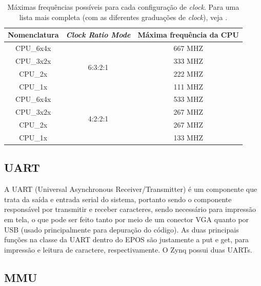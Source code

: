 \begin{table}[ht]
	\centering
	\begin{tabular}{ccc}
		\hline\hline
		Nomenclatura & \emph{Clock Ratio Mode} & Máxima frequência da CPU\\[0.5ex]
		\hline
		CPU\_6x4x & \multirow{4}{*}{6:3:2:1} & 667 MHZ\\
		CPU\_3x2x &                          & 333 MHZ\\
		CPU\_2x   &                          & 222 MHZ\\
		CPU\_1x   &                          & 111 MHZ\\
		\hline
		CPU\_6x4x & \multirow{4}{*}{4:2:2:1} & 533 MHZ\\
		CPU\_3x2x &                          & 267 MHZ\\
		CPU\_2x   &                          & 267 MHZ\\
		CPU\_1x   &                          & 133 MHZ\\[1ex]
		\hline
	\end{tabular}
	\caption{Máximas frequências possíveis para cada configuração de \emph{clock}. Para uma lista mais completa (com as diferentes graduações de \emph{clock}), veja \cite[p.~13]{data_sheet}.}
	\label{tab:clocks}
\end{table}


\subsection{UART}
A UART (Universal Asynchronous Receiver/Transmitter) é um componente que trata da saída e entrada serial do sistema, portanto sendo o componente responsável por transmitir e receber caracteres, sendo necessário para impressão em tela, o que pode ser feito tanto por meio de um conector VGA quanto por USB (usado principalmente para depuração do código). As duas principais funções na classe da UART dentro do EPOS são justamente a put e get, para impressão e leitura de caractere, respectivamente. O Zynq possui duas UARTs.



\subsection{MMU} %

